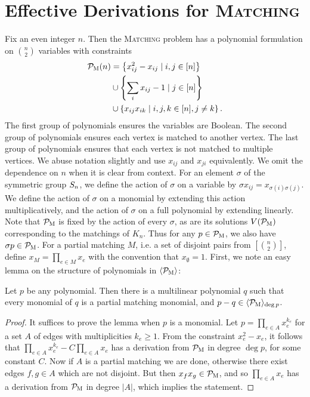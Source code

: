 \section{Effective Derivations for \textsc{Matching}}
Fix an even integer $n$. Then the \textsc{Matching} problem has a polynomial formulation on $\binom{n}{2}$ variables with constraints
\begin{align}
\label{eq:matching-formulation}\mathcal P_{\textsc{M}}(n) &= \left\{x_{ij}^2 - x_{ij} \mid i,j \in [n]\right\} \\ &\cup \left\{\sum_i x_{ij} - 1 \mid j \in [n]\right\} \nonumber \\ &\cup \left\{x_{ij}x_{ik} \mid i,j,k \in [n], j\neq k\right\} \nonumber.
\end{align}
The first group of polynomials ensures the variables are Boolean. The second group of polynomials ensures each vertex is matched to another vertex. The last group of polynomials ensures that each vertex is not matched to multiple vertices. We abuse notation slightly and use $x_{ij}$ and $x_{ji}$ equivalently. We omit the dependence on $n$ when it is clear from context. For an element $\sigma$ of the symmetric group $S_{n}$, we define the action of $\sigma$ on a variable by $\sigma x_{ij} = x_{\sigma(i)\sigma(j)}$.
We define the action of $\sigma$ on a monomial by extending this action multiplicatively, and the action of $\sigma$ on a full polynomial by extending linearly.
Note that $\mathcal P_{\textsc{M}}$ is fixed by the action of every $\sigma$, as are its solutions $V(\mathcal P_{\textsc{M}})$ corresponding to the matchings of $K_n$. 
Thus for any $p \in \mathcal P_{\textsc{M}}$, we also have $\sigma p \in \mathcal P_{\textsc{M}}$. For a partial matching $M$, i.e. a set of disjoint pairs from $[\binom{n}{2}]$, define $x_M = \prod_{e \in M} x_e$ with the convention that $x_{\emptyset} = 1$.
First, we note an easy lemma on the structure of polynomials in $\langle \mathcal P_{\textsc{M}} \rangle$:
\begin{lemma}\label{lem:monomials}
  Let $p$ be any polynomial. Then there is a multilinear polynomial $q$ such that every monomial of $q$ is a partial matching monomial, and $p-q \in \langle \mathcal P_{\textsc{M}} \rangle_{\deg p}$.
\end{lemma}
\begin{proof}
It suffices to prove the lemma when \(p\) is a monomial. Let
\(p = \prod_{e \in A} x_{e}^{k_{e}}\)
for a set \(A\) of edges with multiplicities \(k_{e} \geq 1\).
From the constraint \(x_{e}^{2} - x_e\), it follows that
$\prod_{e \in A} x_e^{k_e} - C\prod_{e \in A} x_e$ has a derivation from $\mathcal P_{\textsc{M}}$ in degree $\deg p$, for some constant $C$.
Now if $A$ is a partial matching we are done, otherwise there exist edges $f,g \in A$ which are not disjoint.
But then $x_fx_g \in \mathcal P_{\textsc{M}}$, and so $\prod_{e \in A} x_e$ has a derivation from $\mathcal P_{\textsc{M}}$ in degree $|A|$, which implies the statement.
\end{proof}
